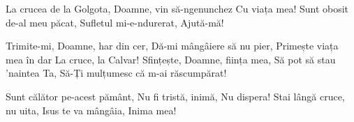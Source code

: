 \beginverse
La crucea de la Golgota,
Doamne, vin să-ngenunchez
Cu viața mea!
Sunt obosit de-al meu păcat,
Sufletul mi-e-ndurerat,
Ajută-mă!
\endverse

\beginchorus
Trimite-mi, Doamne, har din cer,
Dă-mi mângâiere să nu pier,
Primește viața mea în dar
La cruce, la Calvar!
Sfințește, Doamne, ființa mea,
Să pot să stau ’naintea Ta,
Să-Ți mulțumesc că m-ai răscumpărat!
\endchorus

\beginverse
Sunt călător pe-acest pământ,
Nu fi tristă, inimă,
Nu dispera!
Stai lângă cruce, nu uita,
Isus te va mângâia,
Inima mea!
\endverse
\endsong